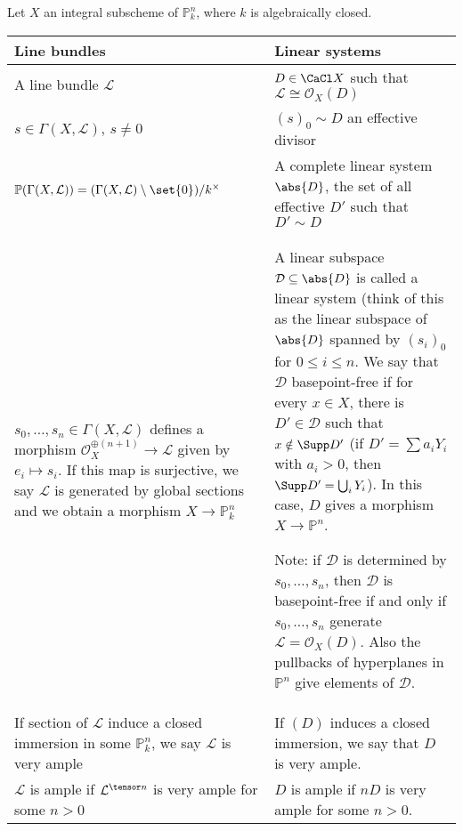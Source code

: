 Let $X$ an integral subscheme of $\mathbb{P}^n_k$, where $k$ is algebraically closed.
\begin{tabular}{@{}p{}p{}@{}}\toprule
	Line bundles & Linear systems\\ \midrule
	A line bundle $\mathcal{L}$ & $D \in \CaCl X$ such that $\mathcal{L}\cong \mathcal{O}_X(D)$ \\
	$s \in \Gamma(X, \mathcal{L})$, $s\neq 0$ & $(s)_0\sim D$ an effective divisor\\
	$\mathbb{P}(\Gamma(X, \mathcal{L})) = (\Gamma(X, \mathcal{L})\setminus\set{0})/k^\times$ &
	A complete linear system $\abs{D}$, the set of all effective $D'$ such that
	$D'\sim D$\\
	$s_0, \ldots, s_n \in \Gamma(X, \mathcal{L})$ defines a morphism
	$\mathcal{O}_X^{\oplus(n+1)}\to \mathcal{L}$ given by $e_i\mapsto s_i$. If this
	map is surjective, we say $\mathcal{L}$ is generated by global sections and
	we obtain a morphism $X\to \mathbb{P}^n_k$ & A linear subspace $\mathcal{D} \subseteq \abs{D}$
	is called a linear system (think of this as the linear subspace of $\abs{D}$
	spanned by $(s_i)_0$ for $0\leq i\leq n$. We say that $\mathcal{D}$ basepoint-free
	if for every $x \in X$, there is $D' \in \mathcal{D}$ such that $x\notin \Supp D'$
	(if $D' = \sum a_iY_i$ with $a_i > 0$, then $\Supp D' = \bigcup_i Y_i$).
	In this case, $D$ gives a morphism $X\to \mathbb{P}^n$.

	Note: if $\mathcal{D}$ is determined by $s_0, \ldots, s_n$, then $\mathcal{D}$ is
	basepoint-free if and only if $s_0, \ldots, s_n$ generate $\mathcal{L} = \mathcal{O}_X(D)$.
	Also the pullbacks of hyperplanes in $\mathbb{P}^n$ give elements of $\mathcal{D}$.\\
	If section of $\mathcal{L}$ induce a closed immersion in some $\mathbb{P}^n_k$,
	we say $\mathcal{L}$ is very ample & If $(D)$ induces a closed immersion, we say
	that $D$ is very ample.\\
	$\mathcal{L}$ is ample if $\mathcal{L}^{\tensor n}$ is very ample for some
	$n > 0$ & $D$ is ample if $nD$ is very ample for some $n>0$. \\ \bottomrule
\end{tabular}
